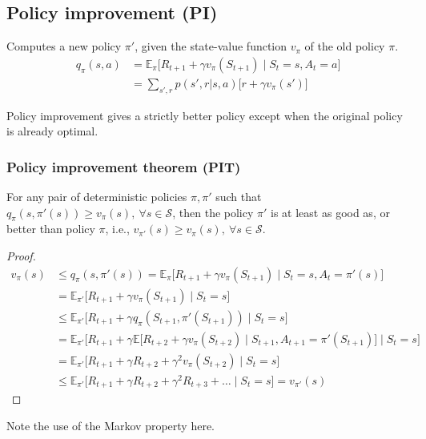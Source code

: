 \subsection{Policy improvement (PI)}\label{sec:policy-improvement}

Computes a new policy \( \pi' \), given the state-value function \( v_\pi \) of the old policy \( \pi \).
\begin{equation}
    \begin{aligned}
        q_\pi(s, a)
         & =
        \mathbb{E}_{\pi} \big[ R_{t+1} + \gamma v_\pi(S_{t+1}) \;\big|\; S_t = s, A_t = a \big]
        \\ & =
        \sum_{s', r} p(s', r | s, a) \Big[ r + \gamma v_\pi(s') \Big]
    \end{aligned}
\end{equation}

Policy improvement gives a strictly better policy except when the original policy is already optimal.

\subsubsection{Policy improvement theorem (PIT)}

For any pair of deterministic policies \( \pi, \pi' \) such that \( q_\pi(s, \pi'(s)) \geq v_\pi(s), \ \forall s \in \mathcal{S} \), then the policy \( \pi' \) is at least as good as, or better than policy \( \pi \), i.e., \( v_{\pi'}(s) \geq v_\pi(s), \ \forall s \in \mathcal{S} \).
\begin{proof}
    \begin{equation*}
        \begin{aligned}
            v_{\pi}(s)
             & \leq
            q_{\pi}(s, \pi'(s))
            =
            \mathbb{E}_{\pi} \big[ R_{t+1} + \gamma v_{\pi}(S_{t+1}) \;\big|\; S_t = s, A_t = \pi'(s) \big]
            \\ & =
            \mathbb{E}_{\pi'} \big[ R_{t+1} + \gamma v_{\pi}(S_{t+1}) \;\big|\; S_t = s \big]
            \\ & \leq
            \mathbb{E}_{\pi'} \big[ R_{t+1} + \gamma q_{\pi}(S_{t+1}, \pi'(S_{t+1})) \;\big|\; S_t = s \big]
            \\ & =
            \mathbb{E}_{\pi'} \big[ R_{t+1} + \gamma \mathbb{E} \big[ R_{t+2} + \gamma v_{\pi}(S_{t+2}) \;\big|\; S_{t+1}, A_{t+1} = \pi'(S_{t+1}) \big] \;\big|\; S_t = s \big]
            \\ & =
            \mathbb{E}_{\pi'} \big[ R_{t+1} + \gamma R_{t+2} + \gamma^2 v_{\pi}(S_{t+2}) \;\big|\; S_t = s \big]
            \\ & \leq
            \mathbb{E}_{\pi'} \big[ R_{t+1} + \gamma R_{t+2} + \gamma^2 R_{t+3} + \dots \;\big|\; S_t = s \big]
            = v_{\pi'}(s)
        \end{aligned}
    \end{equation*}
\end{proof}
Note the use of the Markov property here.

